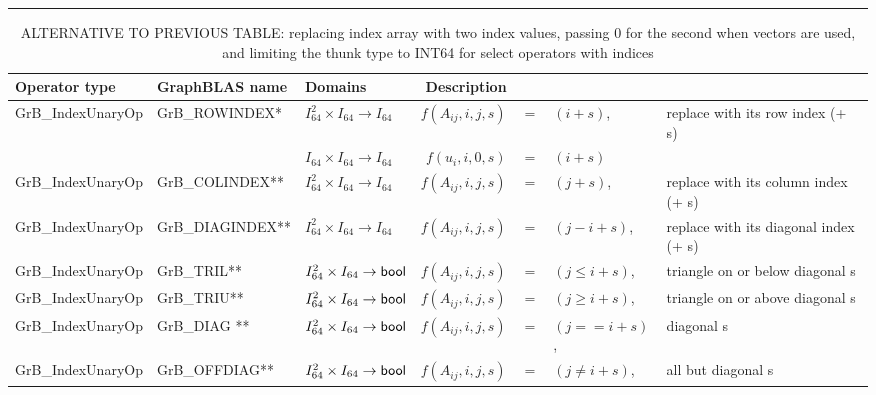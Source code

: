 \begin{landscape}
\begin{table}
\hspace{-2.5em}\begin{threeparttable}
\hrule
\vspace{1\baselineskip}
\caption{ALTERNATIVE TO PREVIOUS TABLE: replacing index array with two index values, passing 0 for the second when vectors are used, and limiting the thunk type to INT64 for select operators with indices}
\vspace{1\baselineskip}

\begin{tabular}{l|l|l|rcll}
Operator type             & GraphBLAS name               & Domains                            & Description \\ \hline
{\sf GrB\_IndexUnaryOp}   & {\sf GrB\_ROWINDEX}*    & $I_{64}^2 \times I_{64} \rightarrow I_{64}$ & $f(A_{ij},i,j,s)$ & $=$ & $(i + s)$, & replace with its row index (+ s) \\
                          &                         & $I_{64}   \times I_{64} \rightarrow I_{64}$ & $f(u_{i}, i,0,s)$ & $=$ & $(i + s)$ \\
{\sf GrB\_IndexUnaryOp}   & {\sf GrB\_COLINDEX}**   & $I_{64}^2 \times I_{64} \rightarrow I_{64}$ & $f(A_{ij},i,j,s)$ & $=$ & $(j + s)$, & replace with its column index (+ s) \\
{\sf GrB\_IndexUnaryOp}   & {\sf GrB\_DIAGINDEX}**  & $I_{64}^2 \times I_{64} \rightarrow I_{64}$ & $f(A_{ij},i,j,s)$ & $=$ & $(j - i + s)$, & replace with its diagonal index (+ s) \\
\hline

{\sf GrB\_IndexUnaryOp}   & {\sf GrB\_TRIL}**    & $I_{64}^2 \times I_{64} \rightarrow {\sf bool}$ & $f(A_{ij},i,j,s)$ & $=$ & $(j \leq i + s)$, & triangle on or below diagonal s \\
{\sf GrB\_IndexUnaryOp}   & {\sf GrB\_TRIU}**    & $I_{64}^2 \times I_{64} \rightarrow {\sf bool}$ & $f(A_{ij},i,j,s)$ & $=$ & $(j \geq i + s)$, & triangle on or above diagonal s \\
{\sf GrB\_IndexUnaryOp}   & {\sf GrB\_DIAG} **   & $I_{64}^2 \times I_{64} \rightarrow {\sf bool}$ & $f(A_{ij},i,j,s)$ & $=$ & $(j  ==  i + s)$, & diagonal s \\
{\sf GrB\_IndexUnaryOp}   & {\sf GrB\_OFFDIAG}** & $I_{64}^2 \times I_{64} \rightarrow {\sf bool}$ & $f(A_{ij},i,j,s)$ & $=$ & $(j \neq i + s)$, & all but diagonal s \\


\end{tabular}
\end{threeparttable}
\end{table}
\end{landscape}
